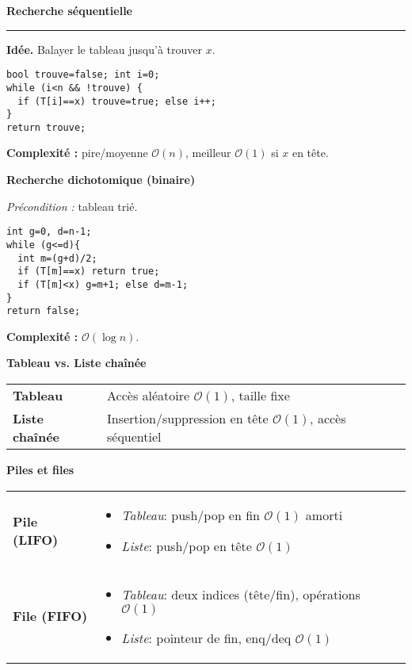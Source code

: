\documentclass[9pt,a4paper]{article}
\newcommand{\bigO}{\mathcal{O}}
\newcommand{\sect}[1]{\vspace{1ex}\textbf{\large #1}\par\vspace{0.3ex}\hrule\vspace{0.6ex}}
\newcommand{\subsect}[1]{\vspace{0.4ex}\textbf{#1}\par}
\begin{document}
\scriptsize

\begin{multicols}{3}
    \sloppy\raggedcolumns

    \sect{Recherche séquentielle}
    \textbf{Idée.} Balayer le tableau jusqu'à trouver $x$.
    \begin{lstlisting}[style=tight]
bool trouve=false; int i=0;
while (i<n && !trouve) {
  if (T[i]==x) trouve=true; else i++;
}
return trouve;
\end{lstlisting}
    \textbf{Complexité :} pire/moyenne $\bigO(n)$, meilleur $\bigO(1)$ si $x$ en tête.

    \subsect{Recherche dichotomique (binaire)}
    \emph{Précondition :} tableau trié.
    \begin{lstlisting}[style=tight]
int g=0, d=n-1;
while (g<=d){
  int m=(g+d)/2;
  if (T[m]==x) return true;
  if (T[m]<x) g=m+1; else d=m-1;
}
return false;
\end{lstlisting}
    \textbf{Complexité :} $\bigO(\log n)$.

    \subsect{Tableau vs. Liste chaînée}
    \begin{tabularx}{\linewidth}{@{}>{\bfseries}lX@{}}
        Tableau       & Accès aléatoire $\bigO(1)$, taille fixe                    \\
        Liste chaînée & Insertion/suppression en tête $\bigO(1)$, accès séquentiel \\
    \end{tabularx}

    \subsect{Piles et files}
    \begin{tabularx}{\linewidth}{@{}lX@{}}
        \textbf{Pile (LIFO)} &
        \begin{itemize}
            \item \textit{Tableau}: push/pop en fin $\bigO(1)$ amorti
            \item \textit{Liste}: push/pop en tête $\bigO(1)$
        \end{itemize} \\
        \textbf{File (FIFO)} &
        \begin{itemize}
            \item \textit{Tableau}: deux indices (tête/fin), opérations $\bigO(1)$
            \item \textit{Liste}: pointeur de fin, enq/deq $\bigO(1)$
        \end{itemize} \\
    \end{tabularx}


\end{multicols}
\end{document}
